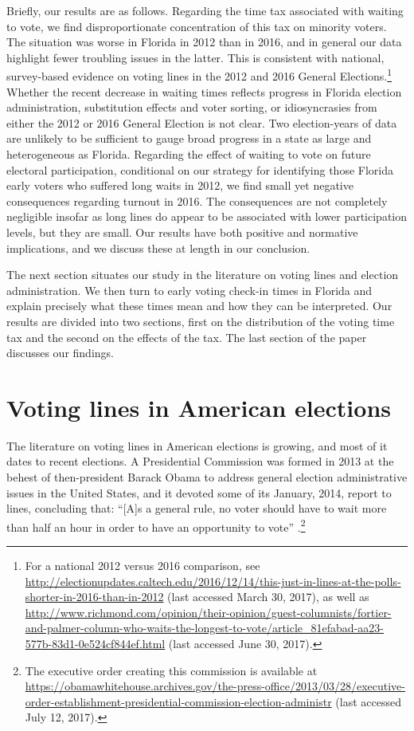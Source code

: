\documentclass[12pt,titlepage]{article}
\begin{document}
Briefly, our results are as follows.  Regarding the time tax
associated with waiting to vote, we find disproportionate
concentration of this tax on minority voters.  The situation was worse
in Florida in 2012 than in 2016, and in general our data highlight
fewer troubling issues in the latter.  This is consistent with
national, survey-based evidence on voting lines in the 2012 and 2016
General Elections.\footnote{For a national 2012 versus 2016
  comparison, see
  \url{http://electionupdates.caltech.edu/2016/12/14/this-just-in-lines-at-the-polls-shorter-in-2016-than-in-2012}
  (last accessed March 30, 2017), as well as
  \url{http://www.richmond.com/opinion/their-opinion/guest-columnists/fortier-and-palmer-column-who-waits-the-longest-to-vote/article_81efabad-aa23-577b-83d1-0e524cf844ef.html}
  (last accessed June 30, 2017).}  Whether the recent decrease in
waiting times reflects progress in Florida election administration,
substitution effects and voter sorting, or idiosyncrasies from either
the 2012 or 2016 General Election is not clear.  Two election-years of
data are unlikely to be sufficient to gauge broad progress in a state
as large and heterogeneous as Florida.  Regarding the effect of
waiting to vote on future electoral participation, conditional on our
strategy for identifying those Florida early voters who suffered long
waits in 2012, we find small yet negative consequences regarding
turnout in 2016. The consequences are not completely negligible
insofar as long lines do appear to be associated with lower
participation levels, but they are small.  Our results have both
positive and normative implications, and we discuss these at length in
our conclusion.

The next section situates our study in the literature on voting lines
and election administration.  We then turn to early voting check-in
times in Florida and explain precisely what these times mean and how
they can be interpreted.  Our results are divided into two sections,
first on the distribution of the voting time tax and the second on the
effects of the tax.  The last section of the paper discusses our findings.

\section*{Voting lines in American elections}

The literature on voting lines in American elections is growing, and
most of it dates to recent elections.  A Presidential Commission was
formed in 2013 at the behest of then-president Barack Obama to address
general election administrative issues in the United States, and it
devoted some of its January, 2014, report to lines, concluding that:
``[A]s a general rule, no voter should have to wait more than half an
hour in order to have an opportunity to vote'' \citep[p.\
13,][]{pcea:2014}.\footnote{The executive order creating this
  commission is available at
  \url{https://obamawhitehouse.archives.gov/the-press-office/2013/03/28/executive-order-establishment-presidential-commission-election-administr}
  (last accessed July 12, 2017).}
\end{document}

